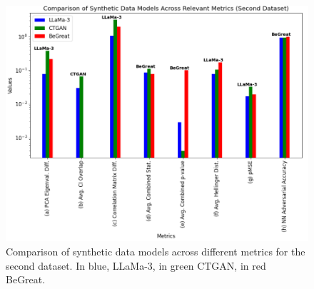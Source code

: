 \begin{figure}[H]
    \centering
        \centering
        \includegraphics[width=1\textwidth]{images/dataset2_metrics.png}
        \caption{Comparison of synthetic data models across different metrics for the second dataset. In blue, LLaMa-3, in green CTGAN, in red BeGreat.}
        \label{fig:dataset2_metrics}
\end{figure}


